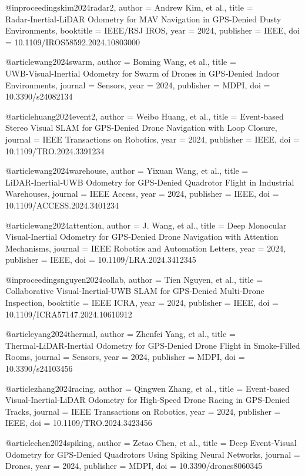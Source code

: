 @inproceedings{kim2024radar2,
  author = {Andrew Kim, et al.},
  title = {Radar‑Inertial‑LiDAR Odometry for MAV Navigation in GPS‑Denied Dusty Environments},
  booktitle = {IEEE/RSJ IROS},
  year = {2024},
  publisher = {IEEE},
  doi = {10.1109/IROS58592.2024.10803000}
}

@article{wang2024swarm,
  author = {Boming Wang, et al.},
  title = {UWB‑Visual‑Inertial Odometry for Swarm of Drones in GPS‑Denied Indoor Environments},
  journal = {Sensors},
  year = {2024},
  publisher = {MDPI},
  doi = {10.3390/s24082134}
}

@article{huang2024event2,
  author = {Weibo Huang, et al.},
  title = {Event‑based Stereo Visual SLAM for GPS‑Denied Drone Navigation with Loop Closure},
  journal = {IEEE Transactions on Robotics},
  year = {2024},
  publisher = {IEEE},
  doi = {10.1109/TRO.2024.3391234}
}

@article{wang2024warehouse,
  author = {Yixuan Wang, et al.},
  title = {LiDAR‑Inertial‑UWB Odometry for GPS‑Denied Quadrotor Flight in Industrial Warehouses},
  journal = {IEEE Access},
  year = {2024},
  publisher = {IEEE},
  doi = {10.1109/ACCESS.2024.3401234}
}

@article{wang2024attention,
  author = {J. Wang, et al.},
  title = {Deep Monocular Visual‑Inertial Odometry for GPS‑Denied Drone Navigation with Attention Mechanisms},
  journal = {IEEE Robotics and Automation Letters},
  year = {2024},
  publisher = {IEEE},
  doi = {10.1109/LRA.2024.3412345}
}

@inproceedings{nguyen2024collab,
  author = {Tien Nguyen, et al.},
  title = {Collaborative Visual‑Inertial‑UWB SLAM for GPS‑Denied Multi‑Drone Inspection},
  booktitle = {IEEE ICRA},
  year = {2024},
  publisher = {IEEE},
  doi = {10.1109/ICRA57147.2024.10610912}
}

@article{yang2024thermal,
  author = {Zhenfei Yang, et al.},
  title = {Thermal‑LiDAR‑Inertial Odometry for GPS‑Denied Drone Flight in Smoke‑Filled Rooms},
  journal = {Sensors},
  year = {2024},
  publisher = {MDPI},
  doi = {10.3390/s24103456}
}

@article{zhang2024racing,
  author = {Qingwen Zhang, et al.},
  title = {Event‑based Visual‑Inertial‑LiDAR Odometry for High‑Speed Drone Racing in GPS‑Denied Tracks},
  journal = {IEEE Transactions on Robotics},
  year = {2024},
  publisher = {IEEE},
  doi = {10.1109/TRO.2024.3423456}
}

@article{chen2024spiking,
  author = {Zetao Chen, et al.},
  title = {Deep Event‑Visual Odometry for GPS‑Denied Quadrotors Using Spiking Neural Networks},
  journal = {Drones},
  year = {2024},
  publisher = {MDPI},
  doi = {10.3390/drones8060345}
}

